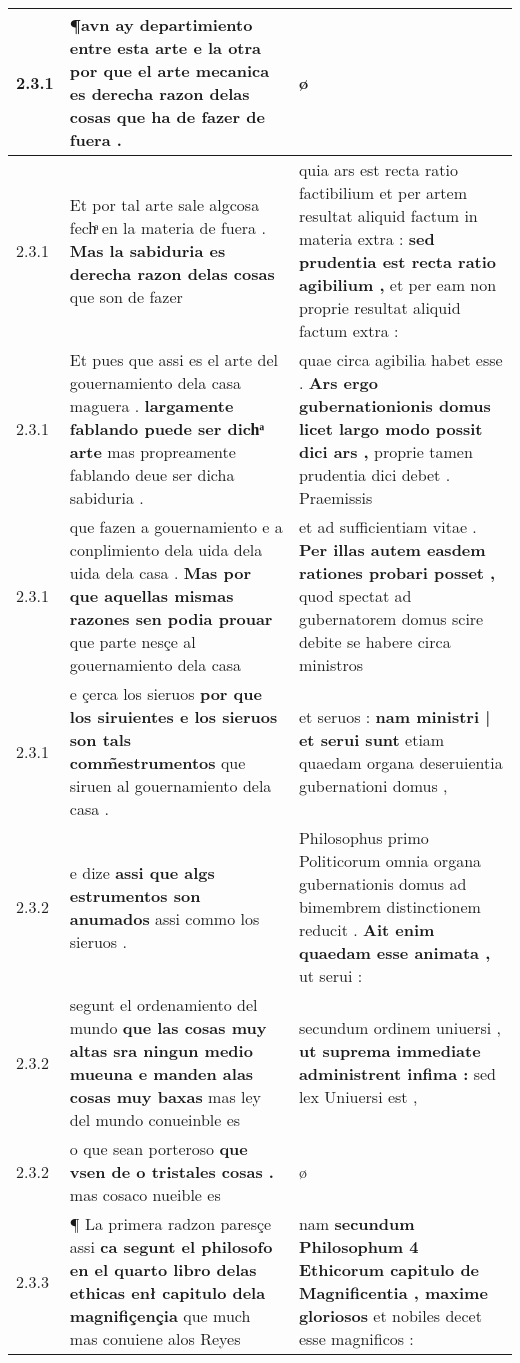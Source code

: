 \begin{tabular}{|p{1cm}|p{6.5cm}|p{6.5cm}|}
2.3.1 & ¶avn ay departimiento entre esta arte e la otra \textbf{ por que el arte mecanica es derecha razon delas cosas } que ha de fazer de fuera . & ø \\\hline
2.3.1 & Et por tal arte sale algcosa fechͣ en la materia de fuera . \textbf{ Mas la sabiduria es derecha razon delas cosas } que son de fazer & quia ars est recta ratio factibilium et per artem resultat aliquid factum in materia extra : \textbf{ sed prudentia est recta ratio agibilium , } et per eam non proprie resultat aliquid factum extra : \\\hline
2.3.1 & Et pues que assi es el arte del gouernamiento dela casa maguera . \textbf{ largamente fablando puede ser dichͣ arte } mas propreamente fablando deue ser dicha sabiduria . & quae circa agibilia habet esse . \textbf{ Ars ergo gubernationionis domus licet largo modo possit dici ars , } proprie tamen prudentia dici debet . Praemissis \\\hline
2.3.1 & que fazen a gouernamiento e a conplimiento dela uida dela uida dela casa . \textbf{ Mas por que aquellas mismas razones sen podia prouar } que parte nesçe al gouernamiento dela casa & et ad sufficientiam vitae . \textbf{ Per illas autem easdem rationes probari posset , } quod spectat ad gubernatorem domus scire debite se habere circa ministros \\\hline
2.3.1 & e çerca los sieruos \textbf{ por que los siruientes e los sieruos son tals comm̃estrumentos } que siruen al gouernamiento dela casa . & et seruos : \textbf{ nam ministri | et serui sunt } etiam quaedam organa deseruientia gubernationi domus , \\\hline
2.3.2 & e dize \textbf{ assi que algs estrumentos son anumados } assi commo los sieruos . & Philosophus primo Politicorum omnia organa gubernationis domus ad bimembrem distinctionem reducit . \textbf{ Ait enim quaedam esse animata , } ut serui : \\\hline
2.3.2 & segunt el ordenamiento del mundo \textbf{ que las cosas muy altas sra ningun medio mueuna e manden alas cosas muy baxas } mas ley del mundo conueinble es & secundum ordinem uniuersi , \textbf{ ut suprema immediate administrent infima : } sed lex Uniuersi est , \\\hline
2.3.2 & o que sean porteroso \textbf{ que vsen de o tristales cosas . } mas cosaco nueible es & ø \\\hline
2.3.3 & ¶ La primera radzon paresçe assi \textbf{ ca segunt el philosofo en el quarto libro delas ethicas enł capitulo dela magnifiçençia } que much mas conuiene alos Reyes & nam \textbf{ secundum Philosophum 4 Ethicorum capitulo de Magnificentia , maxime gloriosos } et nobiles decet esse magnificos : \\\hline

\end{tabular}
